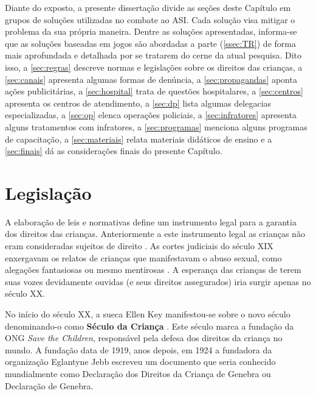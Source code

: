 Diante do exposto, a presente dissertação divide as seções deste Capítulo em grupos de soluções utilizadas no combate ao \ac{ASI}. Cada solução visa mitigar o problema da sua própria maneira. Dentre as soluções apresentadas, informa-se que as soluções baseadas em jogos são abordadas a parte (\autoref{ssec:TR}) de forma mais aprofundada e detalhada por se tratarem do cerne da atual pesquisa. Dito isso, a \autoref{sec:regras} descreve normas e legislações sobre os direitos das crianças, a \autoref{sec:canais} apresenta algumas formas de denúncia, a \autoref{sec:propagandas} aponta ações publicitárias, a \autoref{sec:hospital} trata de questões hospitalares, a \autoref{sec:centros} apresenta os centros de atendimento, a \autoref{sec:dp} lista algumas delegacias especializadas, a \autoref{sec:op} elenca operações policiais, a \autoref{sec:infratores} apresenta alguns tratamentos com infratores, a \autoref{sec:programas} menciona alguns programas de capacitação, a \autoref{sec:materiais} relata materiais didáticos de ensino e a \autoref{sec:finais} dá as considerações finais do presente Capítulo. 


\section{Legislação}\label{sec:regras}

A elaboração de leis e normativas define um instrumento legal para a garantia dos direitos das crianças. Anteriormente a este instrumento legal as crianças não eram consideradas sujeitos de direito . As cortes judiciais do século XIX enxergavam os relatos de crianças que manifestavam o abuso sexual, como alegações fantasiosas ou mesmo mentirosas \cite{aded2006abuso}. A esperança das crianças de terem suas vozes devidamente ouvidas (e seus direitos assegurados) iria surgir apenas no século XX.

No início do século XX, a sueca Ellen Key manifestou-se sobre o novo século denominando-o como \textbf{Século da Criança} \cite{sandin1999imagens, hayes2002children, junior2016olhares}. Este século marca a fundação da \ac{ONG} \textit{Save the Children}, responsável pela defesa dos direitos da criança no mundo. A fundação data de 1919, anos depois, em 1924 a fundadora da organização Eglantyne Jebb escreveu um documento que seria conhecido mundialmente como Declaração dos Direitos da Criança de Genebra ou Declaração de Genebra.

